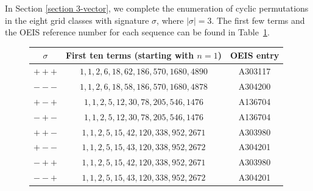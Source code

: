 \documentclass[12pt]{article}
\newcommand{\todo}[1]{\vspace{2 mm}\par\noindent
   \marginpar[\flushright\textsc{ToDo}]{\textsc{ToDo}}\framebox{\begin{minipage}[c]{\textwidth}
   \tt #1 \end{minipage}}\vspace{2 mm}\par}
\theoremstyle{plain}
\theoremstyle{definition}
\begin{document}
 
 In Section \ref{section 3-vector},  we complete the enumeration of cyclic permutations in the eight grid classes with signature $\sigma$, where $|\sigma|=3$. The first few terms and the OEIS reference number for each sequence can be found in Table~\ref{TABLE SIGMA}. 
	

	\begin{figure}[h]
		\centering
	\begin{tabular}{|c|c|c|}
	\hline
	 $\sigma$ & First ten terms (starting with $n=1$) & OEIS entry \\ \hline \hline
	 $+++$ &  $1, 1, 2,6,18,62,186,570, 1680, 4890$ &A303117 \\ \hline
	 $---$ &$1, 1, 2,6,18,58,186,570, 1680, 4878$ & A304200 \\ \hline
	 $+-+$ & $1, 1, 2, 5, 12, 30, 78, 205, 546, 1476$ & A136704 \\ \hline
	 $-+-$ & $1, 1, 2, 5, 12, 30, 78, 205, 546, 1476$ & A136704  \\ \hline
	$++-$ & $1,1,2,5,15,42,120,338,952,2671$ &A303980\\ \hline
	$+--$ &  $1,1,2,5,15,43,120,338,952,2672$&A304201 \\ \hline
	$-++$ & $1,1,2,5,15,42,120,338,952,2671$& A303980  \\ \hline
	$--+$ & $1,1,2,5,15,43,120,338,952,2672$&A304201  \\ \hline
	\end{tabular} 
	\label{TABLE SIGMA}
	\end{figure}
%	
%
%	
%
%
\end{document}
